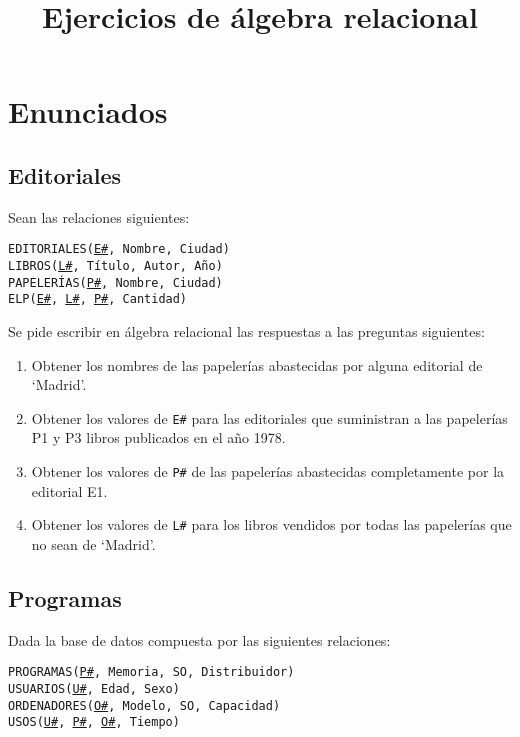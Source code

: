 \documentclass{db-practice}
\title{Ejercicios de álgebra relacional}
\begin{document}
\maketitle

\section{Enunciados}

\subsection{Editoriales}

Sean las relaciones siguientes:

\begin{addmargin}[1.5em]{0em}
    \texttt{EDITORIALES(\underline{E\#}, Nombre, Ciudad)}\\
    \texttt{LIBROS(\underline{L\#}, Título, Autor, Año)}\\
    \texttt{PAPELERÍAS(\underline{P\#}, Nombre, Ciudad)}\\
    \texttt{ELP(\underline{E\#}, \underline{L\#}, \underline{P\#}, Cantidad)}
\end{addmargin}


Se pide escribir en álgebra relacional las respuestas a las preguntas siguientes:

\begin{enumerate}
    \item Obtener los nombres de las papelerías abastecidas por alguna editorial de `Madrid'.
    \item Obtener los valores de \texttt{E\#} para las editoriales que suministran a las papelerías P1 y P3 libros publicados en el año 1978.
    \item Obtener los valores de \texttt{P\#} de las papelerías abastecidas completamente por la editorial E1.
    \item Obtener los valores de \texttt{L\#} para los libros vendidos por todas las papelerías que no sean de `Madrid'.
\end{enumerate}

\subsection{Programas}

Dada la base de datos compuesta por las siguientes relaciones:

\begin{addmargin}[1.5em]{0em}
    \texttt{PROGRAMAS(\underline{P\#}, Memoria, SO, Distribuidor)}\\
    \texttt{USUARIOS(\underline{U\#}, Edad, Sexo)}\\
    \texttt{ORDENADORES(\underline{O\#}, Modelo, SO, Capacidad)}\\
    \texttt{USOS(\underline{U\#}, \underline{P\#}, \underline{O\#}, Tiempo)}
\end{addmargin}
\end{document}
